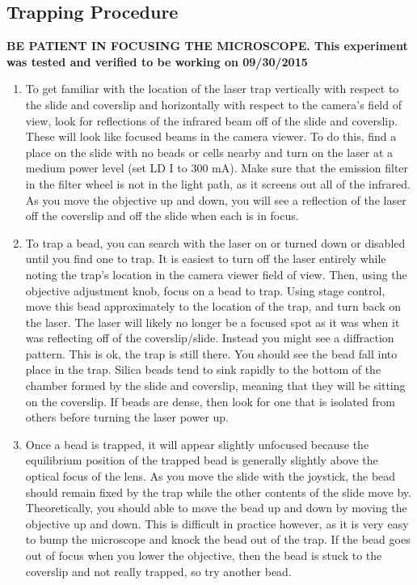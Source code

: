 \documentclass{../lab}
\begin{document}
\subsection{Trapping Procedure}

\textbf{BE PATIENT IN FOCUSING THE MICROSCOPE. This experiment was tested and verified to be working on 09/30/2015}

\begin{enumerate}
    \item To get familiar with the location of the laser trap vertically with respect to the slide and coverslip and horizontally with respect to the camera's field of view, look for reflections of the infrared beam off of the slide and coverslip. These will look like focused beams in the camera viewer. To do this, find a place on the slide with no beads or cells nearby and turn on the laser at a medium power level (set LD I to 300 mA). Make sure that the emission filter in the filter wheel is not in the light path, as it screens out all of the infrared. As you move the objective up and down, you will see a reflection of the laser off the coverslip and off the slide when each is in focus.

    \item To trap a bead, you can search with the laser on or turned down or disabled until you find one to trap. It is easiest to turn off the laser entirely while noting the trap's location in the camera viewer field of view. Then, using the objective adjustment knob, focus on a bead to trap. Using stage control, move this bead approximately to the location of the trap, and turn back on the laser. The laser will likely no longer be a focused spot as it was when it was reflecting off of the coverslip/slide. Instead you might see a diffraction pattern. This is ok, the trap is still there. You should see the bead fall into place in the trap. Silica beads tend to sink rapidly to the bottom of the chamber formed by the slide and coverslip, meaning that they will be sitting on the coverslip. If beads are dense, then look for one that is isolated from others before turning the laser power up.

    \item Once a bead is trapped, it will appear slightly unfocused because the equilibrium position of the trapped bead is generally slightly above the optical focus of the lens. As you move the slide with the joystick, the bead should remain fixed by the trap while the other contents of the slide move by. Theoretically, you should able to move the bead up and down by moving the objective up and down. This is difficult in practice however, as it is very easy to bump the microscope and knock the bead out of the trap. If the bead goes out of focus when you lower the objective, then the bead is stuck to the coverslip and not really trapped, so try another bead.


\end{enumerate}
\end{document}
